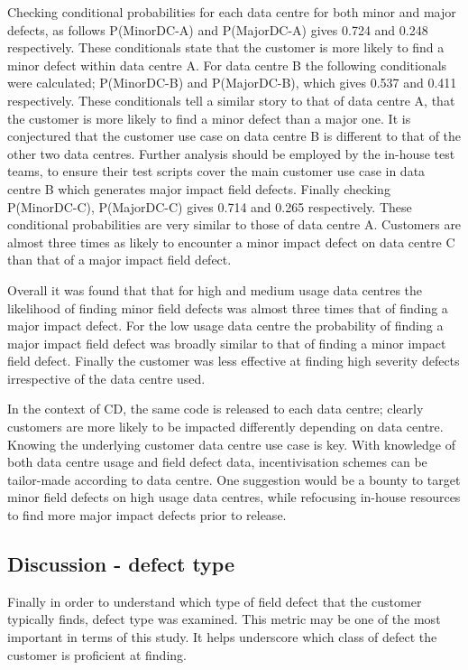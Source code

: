 Checking conditional probabilities for each data centre for both minor and major defects, as follows P(Minor\textbar DC-A) and P(Major\textbar DC-A) gives 0.724 and 0.248 respectively. These conditionals state that the customer is more likely to find a minor defect within data centre A. For data centre B  the following conditionals were calculated; P(Minor\textbar DC-B) and P(Major\textbar DC-B), which gives 0.537 and 0.411 respectively. These conditionals tell a similar story to that of data centre A, that the customer is more likely to find a minor defect than a major one. It is conjectured that the customer use case on data centre B is different to that of the other two data centres. Further analysis should be employed by the in-house test teams, to ensure their test scripts cover the main customer use case in data centre B which generates major impact field defects. Finally checking P(Minor\textbar DC-C), P(Major\textbar DC-C) gives 0.714 and 0.265 respectively. These conditional probabilities are very similar to those of data centre A. Customers are almost three times as likely to encounter a minor impact defect on data centre C than that of a major impact field defect. \par

Overall it was found that that for high and medium usage data centres the likelihood of finding minor field defects was almost three times that of finding a major impact defect. For the low usage data centre the probability of finding a major impact field defect was broadly similar to that of finding a minor impact field defect. Finally the customer was less effective at finding high severity defects irrespective of the data centre used. \par

In the context of CD, the same code is released to each data centre; clearly customers are more likely to be impacted differently depending on data centre. Knowing the underlying customer data centre use case is key. With knowledge of both data centre usage and field defect data, incentivisation schemes can be tailor-made according to data centre. One suggestion would be a bounty to target minor field defects on high usage data centres, while refocusing in-house resources to find more major impact defects prior to release. 


\subsection{Discussion - defect type}
Finally in order to understand which type of field defect that the customer typically finds, defect type was examined. This metric may be one of the most important in terms of this study. It helps underscore which class of defect the customer is proficient at finding. \par

